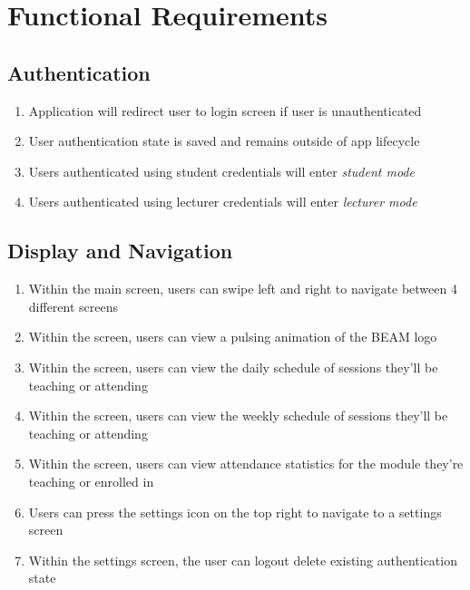 \documentclass[../report.tex]{subfiles}
\begin{document}
\section{Functional Requirements}
\subsection{Authentication}
\begin{enumerate}
\item Application will redirect user to login screen if user is unauthenticated
\item User authentication state is saved and remains outside of app lifecycle
\item Users authenticated using student credentials will enter \textit{student mode}
\item Users authenticated using lecturer credentials will enter \textit{lecturer mode}
\end{enumerate}

\subsection{Display and Navigation}
\begin{enumerate}
\item Within the main screen, users can swipe left and right to navigate between 4 different screens
\item Within the  screen, users can view a pulsing animation of the BEAM logo
\item Within the  screen, users can view the daily schedule of sessions they’ll be teaching or attending
\item Within the  screen, users can view the weekly schedule of sessions they’ll be teaching or attending
\item Within the  screen, users can view attendance statistics for the module they’re teaching or enrolled in
\item Users can press the settings icon on the top right to navigate to a settings screen
\item Within the settings screen, the user can logout delete existing authentication state
\end{enumerate}
\end{document}
